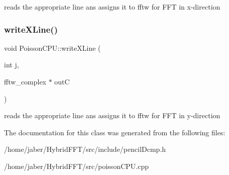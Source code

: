 reads the appropriate line ans assigns it to fftw for F\+FT in x-\/direction \mbox{\label{classPoissonCPU_a4fdd72c648875fa0a4872449e14b4dbf}} 
\subsubsection{\texorpdfstring{write\+X\+Line()}{writeXLine()}}
{\footnotesize\ttfamily void Poisson\+C\+P\+U\+::write\+X\+Line (\begin{DoxyParamCaption}\item[{int}]{j,  }\item[{fftw\+\_\+complex $\ast$}]{outC }\end{DoxyParamCaption})}

reads the appropriate line ans assigns it to fftw for F\+FT in y-\/direction 

The documentation for this class was generated from the following files\+:\begin{DoxyCompactItemize}
\item 
/home/jaber/\+Hybrid\+F\+F\+T/src/include/pencil\+Dcmp.\+h\item 
/home/jaber/\+Hybrid\+F\+F\+T/src/poisson\+C\+P\+U.\+cpp\end{DoxyCompactItemize}
